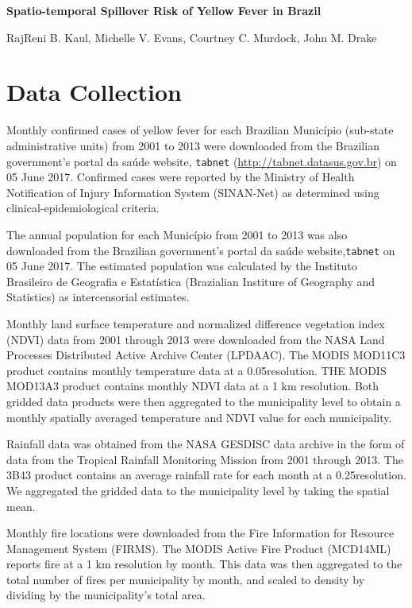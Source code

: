 \documentclass{article}
\begin{document}
\noindent
\textbf{\LARGE{Spatio-temporal Spillover Risk of Yellow Fever in Brazil}}

\bigskip
\noindent
RajReni B. Kaul, Michelle V. Evans, Courtney C. Murdock, John M. Drake
\smallskip

\tableofcontents

\newpage

\section*{Data Collection}

Monthly confirmed cases of yellow fever for each Brazilian Munic\'{i}pio (sub-state administrative units) from 2001 to 2013 were downloaded from the Brazilian government's portal da sa\'{u}de website, \texttt{tabnet} (\url{http://tabnet.datasus.gov.br}) on 05 June 2017.
Confirmed cases were reported by the Ministry of Health Notification of Injury Information System (SINAN-Net) as determined using clinical-epidemiological criteria.

The annual population for each Munic\'{i}pio from 2001 to 2013 was also downloaded from the Brazilian government's portal da sa\'{u}de website,\texttt{tabnet} on 05 June 2017. The estimated population was calculated by the Instituto Brasileiro de Geografia e Estat\'{i}stica (Brazialian Institure of Geography and Statistics) as intercensorial estimates.

Monthly land surface temperature and normalized difference vegetation index (NDVI) data from 2001 through 2013 were downloaded from the NASA Land Processes Distributed Active Archive Center (LPDAAC). The MODIS MOD11C3 product contains monthly temperature data at a 0.05\degree resolution. THE MODIS MOD13A3 product contains monthly NDVI data at a 1 km resolution. Both gridded data products were then aggregated to the municipality level to obtain a monthly spatially averaged temperature and NDVI value for each municipality.

Rainfall data was obtained from the NASA GESDISC data archive in the form of data from the Tropical Rainfall Monitoring Mission from 2001 through 2013. The 3B43 product contains an average rainfall rate for each month at a 0.25\degree resolution. We aggregated the gridded data to the municipality level by taking the spatial mean.

Monthly fire locations were downloaded from the Fire Information for Resource Management System (FIRMS). The MODIS Active Fire Product (MCD14ML) reports fire at a 1 km resolution by month. This data was then aggregated to the total number of fires per municipality by month, and scaled to density by dividing by the municipality's total area.
\end{document}
